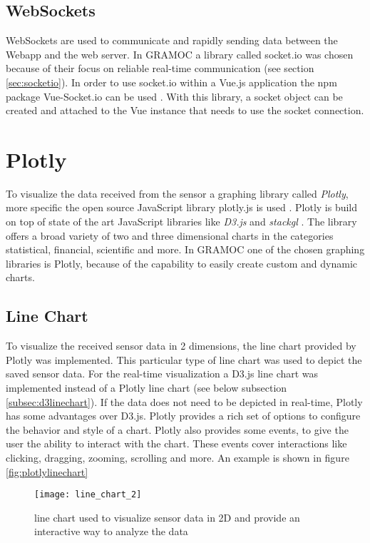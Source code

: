 \subsection{WebSockets}
WebSockets are used to communicate and rapidly sending data between the Webapp and the web server. In GRAMOC a library called socket.io was chosen because of their focus on reliable real-time communication (see section \vref{sec:socketio}). In order to use socket.io within a Vue.js application the npm package Vue-Socket.io can be used \autocite{vuesocketio}. With this library, a socket object can be created and attached to the Vue instance that needs  to use the socket connection.

\section{Plotly}
\label{sec:Plotly}
To visualize the data received from the sensor a graphing library called \textit{Plotly}, more specific the open source JavaScript library {plotly.js} is used \autocite{Plotly} \autocite{PlotlyJS}. Plotly is build on top of state of the art JavaScript libraries like \textit{D3.js}  and \textit{stackgl} \autocite{d3} \autocite{stackgl}. The library offers a broad variety of two and three dimensional charts in the categories statistical, financial, scientific and more. In GRAMOC one of the chosen graphing libraries is Plotly, because of the capability to easily create custom and dynamic charts.

\subsection{Line Chart}
To visualize the received sensor data in 2 dimensions, the line chart provided by Plotly was implemented. This particular type of line chart was used to depict the saved sensor data. For the real-time visualization a D3.js line chart was implemented instead of a Plotly line chart (see below subsection \vref{subsec:d3linechart}). If the data does not need to be depicted in real-time, Plotly has some advantages over D3.js. Plotly provides a rich set of options to configure the behavior and style of a chart. Plotly also provides some events, to give the user the ability to interact with the chart. These events cover interactions like clicking, dragging, zooming, scrolling and more. An example is shown in figure \vref{fig:plotlylinechart}

\begin{figure}[H]
    \centering
    \texttt{[image: line\_chart\_2]}
    \caption{line chart used to visualize sensor data in 2D and provide an interactive way to analyze the data}
    \label{fig:plotlylinechart}
\end{figure}


